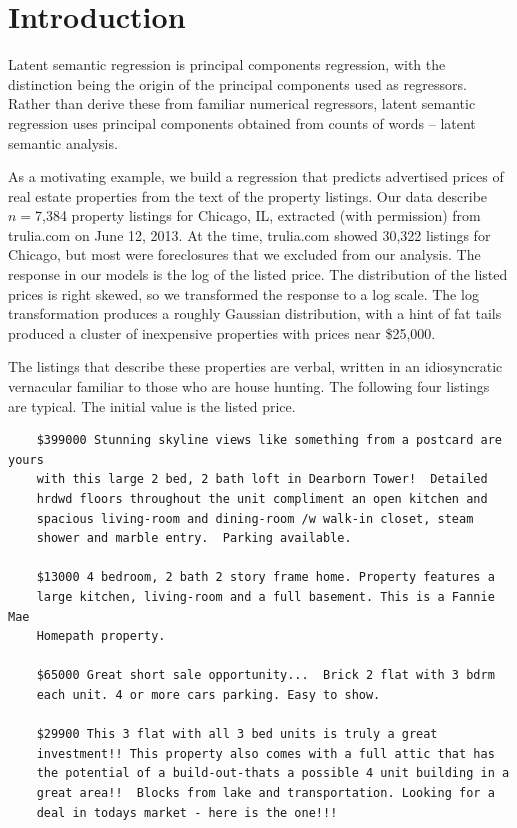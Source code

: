 \documentclass[12pt]{article}
\begin{document}
\section{Introduction}
\label{sec:intro}

  Latent semantic regression is principal components regression, with the
 distinction being the origin of the principal components used as regressors.
  Rather than derive these from familiar numerical regressors, latent semantic
 regression uses principal components obtained from counts of words -- latent
 semantic analysis.  
 
 
 As a motivating example, we build a regression that predicts advertised prices
 of real estate properties from the text of the property listings.  Our data
 describe $n=$7,384 property listings for Chicago, IL, extracted (with
 permission) from trulia.com on June 12, 2013.  At the time, trulia.com showed
 30,322 listings for Chicago, but most were foreclosures that we excluded from
 our analysis.  The response in our models is the log of the listed price.  The
 distribution of the listed prices is right skewed, so we transformed the
 response to a log scale.  The log transformation produces a roughly Gaussian
 distribution, with a hint of fat tails produced a cluster of inexpensive
 properties with prices near \$25,000.
 

 The listings that describe these properties are verbal, written in an
 idiosyncratic vernacular familiar to those who are house hunting. The following
 four listings are typical.  The initial value is the listed price.

 \begin{verbatim}
    $399000 Stunning skyline views like something from a postcard are yours
    with this large 2 bed, 2 bath loft in Dearborn Tower!  Detailed
    hrdwd floors throughout the unit compliment an open kitchen and
    spacious living-room and dining-room /w walk-in closet, steam
    shower and marble entry.  Parking available. 

    $13000 4 bedroom, 2 bath 2 story frame home. Property features a
    large kitchen, living-room and a full basement. This is a Fannie Mae
    Homepath property. 

    $65000 Great short sale opportunity...  Brick 2 flat with 3 bdrm
    each unit. 4 or more cars parking. Easy to show. 

    $29900 This 3 flat with all 3 bed units is truly a great
    investment!! This property also comes with a full attic that has
    the potential of a build-out-thats a possible 4 unit building in a 
    great area!!  Blocks from lake and transportation. Looking for a
    deal in todays market - here is the one!!! 
 \end{verbatim}
\end{document}
